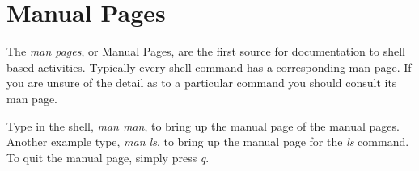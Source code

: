 
\section{Manual Pages} %
\label{sec:manpage}

The \emph{man pages}, or Manual Pages, are the first source
for documentation to shell based activities. Typically every
shell command has a corresponding man page. If you are unsure
of the detail as to a particular command you should consult its
man page.

\begin{prob}
	Type in the shell, \emph{man man}, to bring up the manual
	page of the manual pages. Another example type, \emph{man ls},
	to bring up the manual page for the \emph{ls} command.
	To quit the manual page, simply press \emph{q}.
\end{prob}
